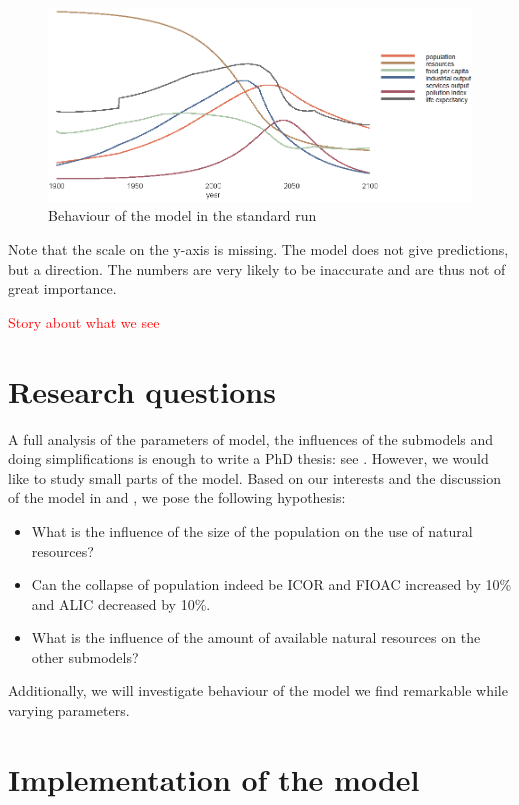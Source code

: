 \documentclass[10pt,a4paper]{scrartcl}
\begin{document}
\begin{figure}
\centering
\includegraphics[width=\textwidth]{./plaatjes/standard-run.png}
\caption{Behaviour of the model in the standard run}
\label{standard-run}
\end{figure}

Note that the scale on the y-axis is missing. The model does not give predictions, but a direction. The numbers are very likely to be inaccurate and are thus not of great importance.

\textcolor{red}{Story about what we see}

\section*{Research questions}

A full analysis of the parameters of model, the influences of the submodels and doing simplifications is enough to write a PhD thesis: see \cite{thissen1978investigations}. However, we would like to study small parts of the model. Based on our interests and the discussion of the model in \cite{thissen1978investigations} and \cite{vermeulen1976parameter}, we pose the following hypothesis:

\begin{itemize}
	\item What is the influence of the size of the population on the use of natural resources?
	\item Can the collapse of population indeed be ICOR and FIOAC increased by 10\% and ALIC decreased by 10\%.
	\item What is the influence of the amount of available natural resources on the other submodels?
\end{itemize}

Additionally, we will investigate behaviour of the model we find remarkable while varying parameters.

\section*{Implementation of the model}
\end{document}
